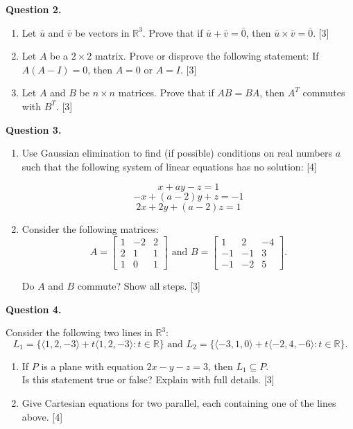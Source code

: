 \documentclass[11pt]{article}
\begin{document}
\newpage

\textbf{Question 2.}
\begin{enumerate}[label=\alph*)]
    \item Let \(\bar{u}\) and \(\bar{v}\) be vectors in \(\mathbb{R}^3\). Prove that if \(\bar{u}+\bar{v} = \bar{0}\), then \(\bar{u}\times\bar{v} = \bar{0}\). \hfill [3]
    \vspace{8cm}
    \item Let \(A\) be a \(2\times2\) matrix. Prove or disprove the following statement: If \(A(A-I) = 0\), then \(A = 0 \text{ or } A = I\). \hfill [3]
    \vspace{8cm}
    \item Let \(A\) and \(B\) be \(n\times n\) matrices. Prove that if \(AB = BA\), then \(A^T\) commutes with \(B^T\). \hfill [3]
\end{enumerate}

\newpage

\textbf{Question 3.}
\begin{enumerate}[label=\alph*)]
    \item Use Gaussian elimination to find (if possible) conditions on real numbers \(a\) such that the following system of linear equations
    has no solution: \hfill [4]

    \[ x + ay - z = 1\]
    \[ -x + (a-2)y + z = -1\]
    \[ 2x + 2y + (a-2)z = 1\]
    \vspace{8cm}
    \item Consider the following matrices:
    \[
A = \begin{bmatrix}
1 & -2 & 2 \\
2 & 1 & 1 \\
1 & 0 & 1
\end{bmatrix}
\text{ and } 
B = \begin{bmatrix}
    1 & 2 & -4 \\
    -1 & -1 & 3 \\
    -1 & -2 & 5
\end{bmatrix}.
\]

Do \(A\) and \(B\) commute? Show all steps. \hfill [3]

\end{enumerate}

\newpage

\textbf{Question 4.}

Consider the following two lines in \(\mathbb{R}^3\):
    \[
        L_1 = \{\langle1,2,-3\rangle + t\langle1,2,-3\rangle : t \in \mathbb{R}\}
        \text{ and }
        L_2 = \{\langle-3,1,0\rangle + t\langle-2,4,-6\rangle : t \in \mathbb{R}\}.
    \]
\begin{enumerate}[label=\alph*), series=Last]
    \item If \(P\) is a plane with equation \(2x-y-z=3\), then \(L_1 \subseteq P\).\\
    Is this statement true or false? Explain with full details. \hfill [3]
    \vspace{8cm}
    \item Give Cartesian equations for two parallel, each containing one of the lines above. \hfill [4]
\end{enumerate}
\end{document}
